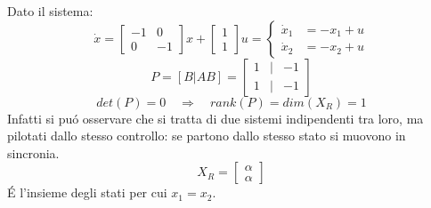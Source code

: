 \documentclass[../main.tex]{subfiles}
\begin{document}
		\begin{mdframed}[style=Exercise]
			\begin{Exercise}[title={Calcolo di $ X_R $ e decomposizione di raggiungibilit\'a}, difficulty=1]
				Dato il sistema:
				\[
					\dot x =
					\begin{bmatrix}
						-1 & 0\\
						0 & -1
					\end{bmatrix} x +
					\begin{bmatrix}
						1\\
						1
					\end{bmatrix} u =
					\begin{cases}
						\dot x_1 &= -x_1+u\\
						\dot x_2 &= -x_2+u
					\end{cases}
				\]
				\[
					P = \left[ B | AB \right] =
					\begin{bmatrix}
						1 & | & -1\\
						1 & | & -1
					\end{bmatrix}
				\]
				\[ 
					det(P) = 0 \quad\Rightarrow\quad rank(P) = dim(X_R) = 1 
				\]
				Infatti si pu\'o osservare che si tratta di due sistemi indipendenti tra loro, ma pilotati dallo stesso controllo: se partono dallo stesso stato si muovono in sincronia.
				\[
					X_R = \begin{bmatrix}
						\alpha\\
						\alpha
					\end{bmatrix}
				\]
				\'E l'insieme degli stati per cui $ x_1 = x_2 $.
				

\end{Exercise}
\end{mdframed}
\end{document}
